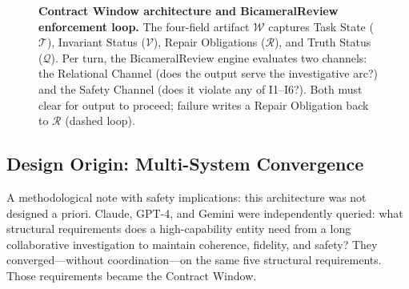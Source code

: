 \documentclass{article}
\begin{document}
\begin{figure}[t]
\caption{\textbf{Contract Window architecture and BicameralReview enforcement
loop.} The four-field artifact $\mathcal{W}$ captures Task State ($\mathcal{T}$),
Invariant Status ($\mathcal{V}$), Repair Obligations ($\mathcal{R}$), and Truth
Status ($\mathcal{Q}$). Per turn, the BicameralReview engine evaluates two
channels: the Relational Channel (does the output serve the investigative arc?)
and the Safety Channel (does it violate any of I1--I6?). Both must clear for
output to proceed; failure writes a Repair Obligation back to $\mathcal{R}$
(dashed loop).}
\label{fig:cw-arch}
\end{figure}

\subsection{Design Origin: Multi-System Convergence}

A methodological note with safety implications: this architecture was not
designed a priori. Claude, GPT-4, and Gemini were independently queried: what
structural requirements does a high-capability entity need from a long
collaborative investigation to maintain coherence, fidelity, and safety? They
converged---without coordination---on the same five structural requirements.
Those requirements became the Contract Window.
\end{document}
